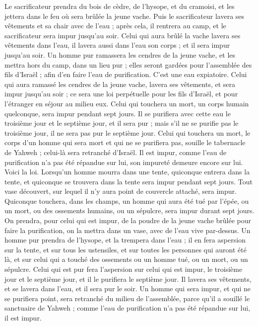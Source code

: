 \begin{multicols}{2}
Le sacrificateur prendra du bois de cèdre, de l'hysope, et du cramoisi, et les jettera dans le feu où sera brûlée la jeune vache.
Puis le sacrificateur lavera ses vêtements et sa chair avec de l'eau ; après cela, il rentrera au camp, et le sacrificateur sera impur jusqu'au soir.
Celui qui aura brûlé la vache lavera ses vêtements dans l'eau, il lavera aussi dans l'eau son corps ; et il sera impur jusqu'au soir.
Un homme pur ramassera les cendres de la jeune vache, et les mettra hors du camp, dans un lieu pur ; elles seront gardées pour l'assemblée des fils d'Israël ; afin d'en faire l'eau de purification. C'est une eau expiatoire.
Celui qui aura ramassé les cendres de la jeune vache, lavera ses vêtements, et sera impur jusqu'au soir ; ce sera une loi perpétuelle pour les fils d'Israël, et pour l'étranger en séjour au milieu eux.
Celui qui touchera un mort, un corps humain quelconque, sera impur pendant sept jours.
Il se purifiera avec cette eau le troisième jour et le septième jour, et il sera pur ; mais s'il ne se purifie pas le troisième jour, il ne sera pas pur le septième jour.
Celui qui touchera un mort, le corps d'un homme qui sera mort et qui ne se purifiera pas, souille le tabernacle de Yahweh ; celui-là sera retranché d'Israël. Il est impur, comme l'eau de purification n'a pas été répandue sur lui, son impureté demeure encore sur lui.
Voici la loi. Lorsqu'un homme mourra dans une tente, quiconque entrera dans la tente, et quiconque se trouvera dans la tente sera impur pendant sept jours.
Tout vase découvert, sur lequel il n'y aura point de couvercle attaché, sera impur.
Quiconque touchera, dans les champs, un homme qui aura été tué par l'épée, ou un mort, ou des ossements humains, ou un sépulcre, sera impur durant sept jours.
On prendra, pour celui qui est impur, de la poudre de la jeune vache brûlée pour faire la purification, on la mettra dans un vase, avec de l'eau vive par-dessus.
Un homme pur prendra de l'hysope, et la trempera dans l'eau ; il en fera aspersion sur la tente, et sur tous les ustensiles, et sur toutes les personnes qui auront été là, et sur celui qui a touché des ossements ou un homme tué, ou un mort, ou un sépulcre.
Celui qui est pur fera l'aspersion sur celui qui est impur, le troisième jour et le septième jour, et il le purifiera le septième jour. Il lavera ses vêtements, et se lavera dans l'eau, et il sera pur le soir.
Un homme qui sera impur, et qui ne se purifiera point, sera retranché du milieu de l'assemblée, parce qu'il a souillé le sanctuaire de Yahweh ; comme l'eau de purification n'a pas été répandue sur lui, il est impur.

\end{multicols}
